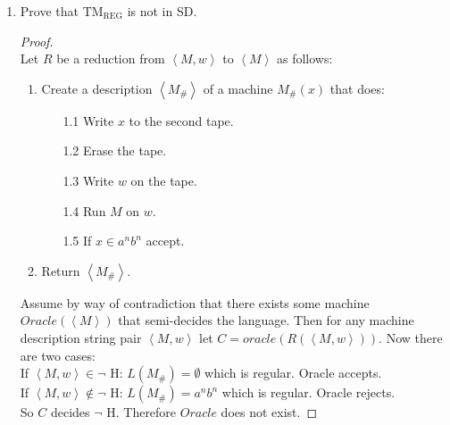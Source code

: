 \documentclass[10pt]{article}
\newcommand{\brackets}[1]{\left< #1 \right>}
\begin{document}
\begin{enumerate}[1)]
\begin{enumerate}[a)]
\begin{proof}[Proof]
If $\brackets{M, w} \in \lnot$ H: $M_1$ accepts nothing and $L(M_1) - L(M_2) = \emptyset$.  Oracle accepts.\\
If $\brackets{M, w} \not \in \lnot$ H: $M_2$ accepts everything and $L(M_1) - L(M_2) = \Sigma ^*$.  Oracle rejects.\\

So $C$ decides $\lnot$ H.  Therefore $Oracle$ does not exist.
\end{proof}
\end{enumerate}


\pagebreak

\item
Prove that $\mathrm{TM_{REG}}$ is not in SD.
\begin{proof}[Proof]$ $\\
Let $R$ be a reduction from $\brackets{M, w}$ to $\brackets{M}$ as follows:
\begin{enumerate}[1.]
\item
Create a description $\brackets{M_\#}$ of a machine $M_\#(x)$ that does:
\begin{enumerate}
\item[1.1]
Write $x$ to the second tape.

\item[1.2]
Erase the tape.

\item[1.3]
Write $w$ on the tape.

\item[1.4]
Run $M$ on $w$.

\item[1.5]
If $x \in a^nb^n$ accept.
\end{enumerate}
\item
Return $\brackets{M_\#}$.
\end{enumerate}

Assume by way of contradiction that there exists some machine $Oracle(\brackets{M})$ that semi-decides the language.  Then for any machine description string pair $\brackets{M, w}$ let $C = oracle(R(\brackets{M, w}))$. Now there are two cases:\\

If $\brackets{M, w} \in \lnot$ H: $L(M_\#) = \emptyset$ which is regular. Oracle accepts.\\
If $\brackets{M, w} \not \in \lnot$ H: $L(M_\#) = a^nb^n$ which is regular. Oracle rejects.\\

So $C$ decides $\lnot$ H.  Therefore $Oracle$ does not exist.
\end{proof}


\end{enumerate}
\end{document}
